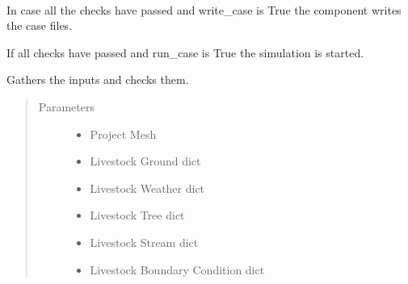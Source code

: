 \documentclass[letterpaper,10pt,english]{sphinxmanual}
\begin{document}
\begin{fulllineitems}
\begin{fulllineitems}
\end{fulllineitems}


\begin{fulllineitems}
\label{\detokenize{cmf:livestock.components.comp_cmf.CMFSolve.run}}~
\begin{DUlineblock}{0em}
\item[] In case all the checks have passed and write\_case is True the component writes the case files.
\item[] If all checks have passed and run\_case is True the simulation is started.
\end{DUlineblock}

\end{fulllineitems}


\begin{fulllineitems}
\label{\detokenize{cmf:livestock.components.comp_cmf.CMFSolve.run_checks}}
Gathers the inputs and checks them.
\begin{quote}\begin{description}
\item[{Parameters}] \leavevmode\begin{itemize}
\item {} 
 \textendash{} Project Mesh

\item {} 
 \textendash{} Livestock Ground dict

\item {} 
 \textendash{} Livestock Weather dict

\item {} 
 \textendash{} Livestock Tree dict

\item {} 
 \textendash{} Livestock Stream dict

\item {} 
 \textendash{} Livestock Boundary Condition dict


\end{itemize}
\end{description}
\end{quote}
\end{fulllineitems}
\end{fulllineitems}
\end{document}

